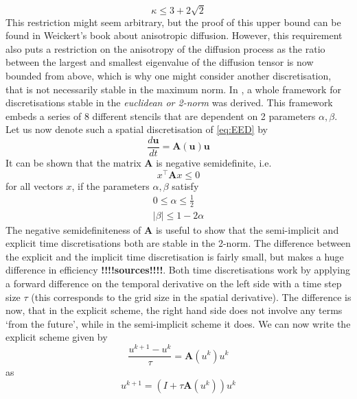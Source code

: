 \begin{equation}
    \kappa \leq 3 + 2\sqrt{2}
\end{equation}
This restriction might seem arbitrary, but the proof of this upper bound can be found in
Weickert's book about anisotropic diffusion\cite{weickert96}.
However, this requirement also puts a restriction on the anisotropy of the diffusion process as the
ratio between the largest and smallest eigenvalue of the diffusion tensor is now bounded from
above, which is why one might consider another discretisation, that is not necessarily stable in
the maximum norm.
In \cite{www13}, a whole framework for discretisations stable in the
\textit{euclidean or 2-norm} was derived. This framework embeds a series of 8 different
stencils that are dependent on 2 parameters $\alpha, \beta$. Let us now denote such a spatial
discretisation of \eqref{eq:EED} by 
\begin{equation}
    \frac{d\mathbf{u}}{dt} = \mathbf{A}(\mathbf{u})\mathbf{u}
\end{equation}
It can be shown that the matrix $\mathbf{A}$ is negative semidefinite, i.e. 
\begin{equation*}
    x^\top \mathbf{A}x \leq 0
\end{equation*}
for all vectors $x$, if the parameters $\alpha,\beta$ satisfy
\begin{eqnarray}
    0 \leq \alpha \leq \frac{1}{2}\\
    \vert\beta\vert \leq 1-2\alpha
\end{eqnarray}
The negative semidefiniteness of $\mathbf{A}$ is useful to show that the semi-implicit and
explicit time discretisations both are stable in the 2-norm.
The difference between the explicit and the implicit time discretisation is fairly small, but makes
a huge difference in efficiency \textbf{!!!!sources!!!!}. Both time discretisations work by applying a forward difference on
the temporal derivative on the left side with a time step size $\tau$ (this corresponds to the grid
size in the spatial derivative). 
The difference is now, that in the explicit scheme, the right hand side does not involve any terms
`from the future', while in the semi-implicit scheme it does.
We can now write the explicit scheme given by
\begin{equation}
    \frac{u^{k+1} - u^{k}}{\tau} = \mathbf{A}(u^k)u^k
\end{equation}
as
\begin{equation}
    u^{k+1} = (I + \tau\mathbf{A}(u^k))u^k
\end{equation}
